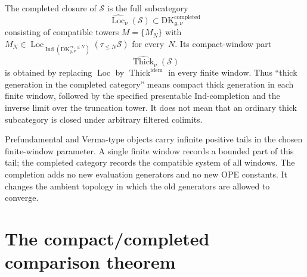 \begin{definition}
\label{def:completed-thick-closure}
%
The completed closure of $\mathcal S$ is the full subcategory
\[
 \widehat{\operatorname{Loc}}_\nu(\mathcal S)
 \subset
 \mathrm{DK}^{\mathrm{completed}}_{\mathfrak g,\nu}
\]
consisting of compatible towers $M=\{M_N\}$ with
$M_N\in
\operatorname{Loc}_{\operatorname{Ind}(
\mathrm{DK}^{\mathrm{ev},\le N}_{\mathfrak g,\nu})}
(\tau_{\le N}\mathcal S)$ for every~$N$.  Its compact-window part
\[
 \widehat{\operatorname{Thick}}_\nu(\mathcal S)
\]
is obtained by replacing $\operatorname{Loc}$ by
$\operatorname{Thick}^{\mathrm{idem}}$ in every finite window.  Thus
``thick generation in the completed category'' means compact thick
generation in each finite window, followed by the specified
presentable Ind-completion and the inverse limit over the
truncation tower.  It does not mean that an ordinary thick subcategory
is closed under arbitrary filtered colimits.
\end{definition}

\begin{remark}
\label{rem:why-completion-natural}
Prefundamental and Verma-type objects carry infinite positive tails in
the chosen finite-window parameter.  A single finite window records a
bounded part of this tail; the completed category records the
compatible system of all windows.  The completion adds no new
evaluation generators and no new OPE constants.  It changes the
ambient topology in which the old generators are allowed to converge.
\end{remark}

\section{The compact/completed comparison theorem}
\label{sec:central-compact-completed-theorem}

